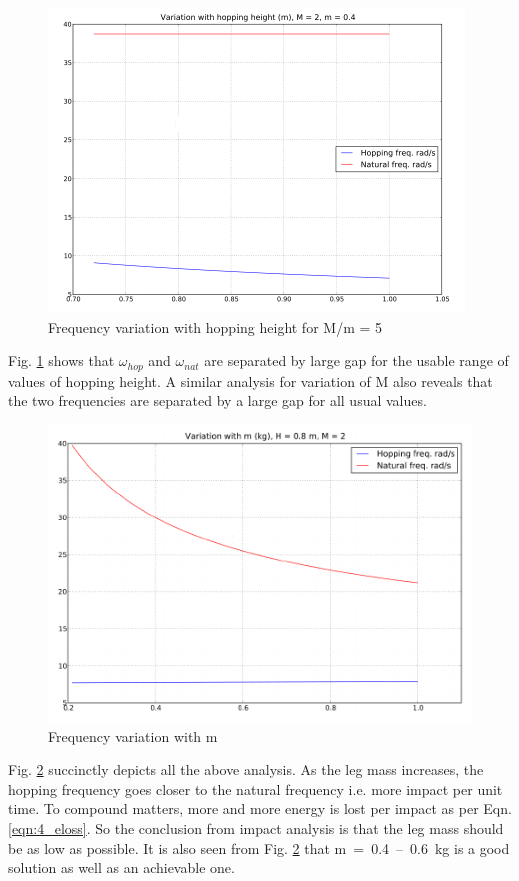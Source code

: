 \begin{figure}[!h]
\centering
\includegraphics[scale=1.8]{fig/freq_hopheight.pdf}
\caption{Frequency variation with hopping height for M/m = 5}
\label{fig:4_freq_height}
\end{figure}
Fig. \ref{fig:4_freq_height} shows that $\omega_{hop}$ and $\omega_{nat}$ are separated by large gap for the usable range
of values of hopping height. A similar analysis for variation of M also reveals that the two frequencies are separated
by a large gap for all usual values.
\begin{figure}[!h]
\centering
\includegraphics[scale=1.5]{fig/freq_m.pdf}
\caption{Frequency variation with m}
\label{fig:4_freq_m}
\end{figure}
Fig. \ref{fig:4_freq_m} succinctly depicts all the above analysis. As the leg mass increases, the hopping frequency goes
closer to the natural frequency i.e. more impact per unit time. To compound matters, more and more energy is lost per impact
as per Eqn. \ref{eqn:4_eloss}. So the conclusion from impact analysis is that the leg mass should be as low as possible. It is also
seen from Fig. \ref{fig:4_freq_m} that \mbox{m = 0.4 -- 0.6 kg} is a good solution as well as an achievable one. 

